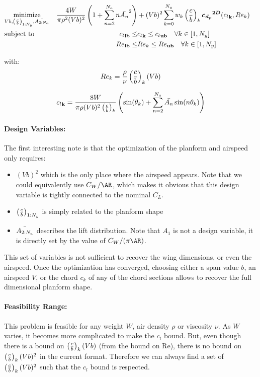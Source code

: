 \documentclass[letterpaper,12pt]{article}
\begin{document}
\begin{align*}
	& \underset{Vb, \left( \frac c b \right)_{1:N_y}, \bar{A_{2:N_a}}}{\text{minimize}}  &
	\frac{4W}{\pi \rho^2 (Vb)^2} \left(1+\sum_{n=2}^{N_a} n \bar{A_{n}}^2\right) &+
(Vb)^2 \sum_{k=0}^{N_y} w_k \left( \frac c b \right)_{k} \boldsymbol{{c_{d_p}}^{2D}}({c_l}_{\bf k}, Re_k) & \\
	& \text{subject to} & {c_l}_{\bf lb} \leq &{c_l}_{\bf k} \leq {c_l}_{\bf ub} \quad \forall k \in [1, N_y] \\
	& & {Re}_{\bf lb} \leq &{Re_k} \leq {Re}_{\bf ub} \quad \forall k \in [1, N_y] 
\end{align*}

with:
$$Re_{k} = \frac{\rho}{\nu}\left( \frac c b \right)_{k}(Vb) $$

$$
	{c_l}_{\bf k} = \frac{8W}{\pi \rho (Vb)^2\left( \frac c b \right)_{k}} \left(\sin(\theta_k) + \sum_{n=2}^{N_a} \bar{A_{n}} \sin(n \theta_k)\right)
$$

\paragraph{Design Variables:} The first interesting note is that the optimization of the planform and airspeed only requires:
\begin{itemize}
	\item $(Vb)^2$ which is the only place where the airspeed appears. Note that we could equivalently use $C_W / \AR$, which makes it obvious that this design variable is tightly connected to the nominal $C_L$.
	\item $\left( \frac c b \right)_{1:N_y}$ is simply related to the planform shape
	\item $\bar{A_{2:N_a}}$ describes the lift distribution. Note that $A_1$ is not a design variable, it is directly set by the value of $C_W / (\pi \AR)$.
\end{itemize}
 This set of variables is not sufficient to recover the wing dimensions, or even the airspeed. Once the optimization has converged, choosing either a span value $b$, an airspeed $V$, or the chord $c_k$ of any of the chord sections allows to recover the full dimensional planform shape.

\paragraph{Feasibility Range:} This problem is feasible for any weight $W$, air density $\rho$ or viscosity $\nu$. As $W$ varies, it becomes more complicated to make the $c_l$ bound. But, even though there is a bound on $\left( \frac c b \right)_{k}(Vb)$ (from the bound on Re), there is no bound on $\left( \frac c b \right)_{k}(Vb)^2$ in the current format. Therefore we can always find a set of $\left( \frac c b \right)_{k}(Vb)^2$ such that the $c_l$ bound is respected.
\end{document}
